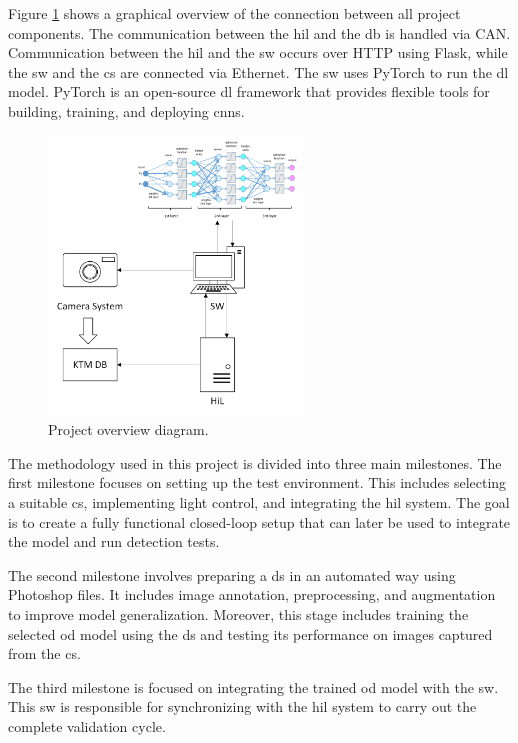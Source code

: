 Figure \ref{proj_overview} shows a graphical overview of the connection between all project components. The communication between the \gls{hil} and the \gls{db} is handled via CAN. Communication between the \gls{hil} and the \gls{sw} occurs over HTTP using Flask, while the \gls{sw} and the \gls{cs} are connected via Ethernet. The \gls{sw} uses PyTorch to run the \gls{dl} model. PyTorch is an open-source \gls{dl} framework that provides flexible tools for building, training, and deploying \gls{cnn}s.

\begin{figure}[!htb]
    \centering
    \includegraphics[width=0.6\textwidth]{Figures/Project_overview.png}
    \caption{Project overview diagram.}
    \label{proj_overview}
\end{figure}

The methodology used in this project is divided into three main milestones.  
The first milestone focuses on setting up the test environment. This includes selecting a suitable \gls{cs}, implementing light control, and integrating the \gls{hil} system. The goal is to create a fully functional closed-loop setup that can later be used to integrate the model and run detection tests.

The second milestone involves preparing a \gls{ds} in an automated way using Photoshop files. It includes image annotation, preprocessing, and augmentation to improve model generalization. Moreover, this stage includes training the selected \gls{od} model using the \gls{ds} and testing its performance on images captured from the \gls{cs}.

The third milestone is focused on integrating the trained \gls{od} model with the \gls{sw}. This \gls{sw} is responsible for synchronizing with the \gls{hil} system to carry out the complete validation cycle.


